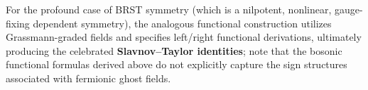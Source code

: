 For the profound case of BRST symmetry (which is a nilpotent, nonlinear, gauge-fixing dependent symmetry), the analogous functional construction utilizes Grassmann-graded fields and specifies left/right functional derivations, ultimately producing the celebrated \textbf{Slavnov--Taylor identities}; note that the bosonic functional formulas derived above do not explicitly capture the sign structures associated with fermionic ghost fields.